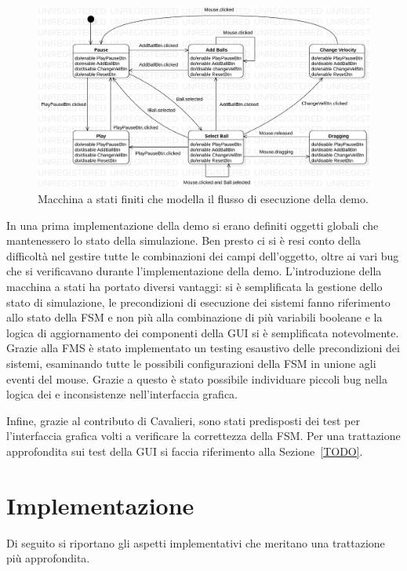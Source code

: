 \begin{figure}[H]
    \centering
    \includegraphics[width=\textwidth]{img/fsm-demo}
    \caption{Macchina a stati finiti che modella il flusso di esecuzione della demo.}\label{fig:fsm-demo}
\end{figure}

In una prima implementazione della demo si erano definiti oggetti globali che mantenessero lo stato della simulazione.
Ben presto ci si è resi conto della difficoltà nel gestire tutte le combinazioni dei campi dell'oggetto, oltre
ai vari bug che si verificavano durante l'implementazione della demo.
L'introduzione della macchina a stati ha portato diversi vantaggi: si è semplificata la gestione dello
stato di simulazione, le precondizioni di esecuzione dei sistemi fanno riferimento allo stato della FSM e non più alla
combinazione di più variabili booleane e la logica di aggiornamento dei componenti della GUI si è semplificata
notevolmente.
Grazie alla FMS è stato implementato un testing esaustivo delle precondizioni dei sistemi, esaminando tutte
le possibili configurazioni della FSM in unione agli eventi del mouse.
Grazie a questo è stato possibile individuare piccoli bug nella logica dei \System e inconsistenze nell'interfaccia
grafica.

Infine, grazie al contributo di Cavalieri, sono stati predisposti dei test per l'interfaccia grafica volti a verificare
la correttezza della FSM. Per una trattazione approfondita sui test della GUI si faccia riferimento alla
Sezione~\ref{TODO}.

\section{Implementazione}\label{sec:demo-implementazione}
Di seguito si riportano gli aspetti implementativi che meritano una trattazione più approfondita.

